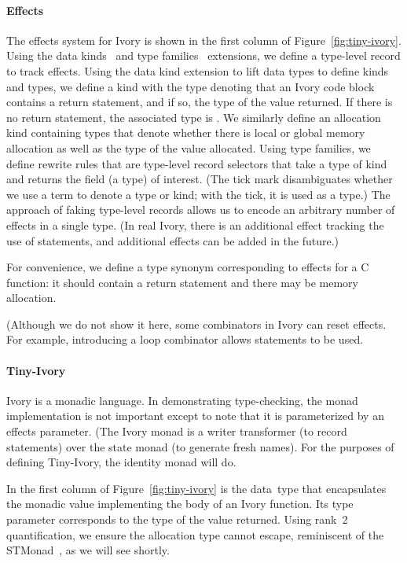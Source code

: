 \paragraph{Effects}
The effects system for Ivory is shown in the first column of
Figure~\ref{fig:tiny-ivory}.  Using the data kinds~\cite{datakinds} and type
families~\cite{typefamilies} extensions, we define a type-level record to track
effects.  Using the data kind extension to lift data types to define kinds and
types, we define a kind  with the type  denoting that an
Ivory code block contains a return statement, and if so, the type of the value
returned.  If there is no return statement, the associated type is .
We similarly define an allocation kind containing types that denote whether
there is local or global memory allocation as well as the type of the value
allocated.  Using type families, we define rewrite rules that are type-level
record selectors that take a type of kind  and returns the field (a
type) of interest.  (The tick mark disambiguates whether we use a term to denote
a type or kind; with the tick, it is used as a type.)  The approach of faking
type-level records allows us to encode an arbitrary number of effects in a
single type.  (In real Ivory, there is an additional effect tracking the use of
 statements, and additional effects can be added in the future.)

For convenience, we define a type synonym  corresponding to
effects for a C function: it should contain a return statement and there may be
memory allocation.

(Although we do not show it here, some combinators in Ivory can reset effects.
For example, introducing a loop combinator allows  statements to be
used.

\paragraph{Tiny-Ivory}
Ivory is a monadic language.  In demonstrating type-checking, the monad
implementation is not important except to note that it is parameterized by an
effects parameter.  (The Ivory monad is a writer transformer (to
record statements) over the state monad (to generate fresh names).  For the
purposes of defining Tiny-Ivory, the identity monad will do.

In the first column of Figure~\ref{fig:tiny-ivory} is the  data~type
that encapsulates the monadic value implementing the body of an Ivory function.
Its type parameter corresponds to the type of the value returned.  Using rank~2
quantification, we ensure the allocation type cannot escape, reminiscent of the
STMonad~\cite{stmonad}, as we will see shortly.

